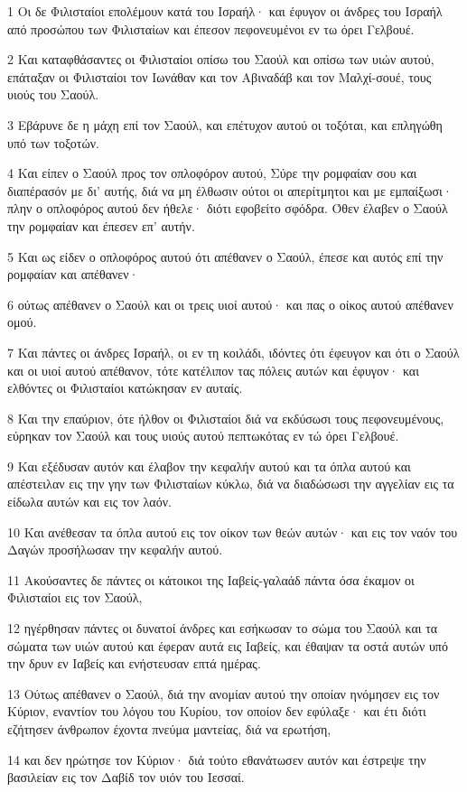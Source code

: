 \par 1 Οι δε Φιλισταίοι επολέμουν κατά του Ισραήλ· και έφυγον οι άνδρες του Ισραήλ από προσώπου των Φιλισταίων και έπεσον πεφονευμένοι εν τω όρει Γελβουέ.
\par 2 Και καταφθάσαντες οι Φιλισταίοι οπίσω του Σαούλ και οπίσω των υιών αυτού, επάταξαν οι Φιλισταίοι τον Ιωνάθαν και τον Αβιναδάβ και τον Μαλχί-σουέ, τους υιούς του Σαούλ.
\par 3 Εβάρυνε δε η μάχη επί τον Σαούλ, και επέτυχον αυτού οι τοξόται, και επληγώθη υπό των τοξοτών.
\par 4 Και είπεν ο Σαούλ προς τον οπλοφόρον αυτού, Σύρε την ρομφαίαν σου και διαπέρασόν με δι' αυτής, διά να μη έλθωσιν ούτοι οι απερίτμητοι και με εμπαίξωσι· πλην ο οπλοφόρος αυτού δεν ήθελε· διότι εφοβείτο σφόδρα. Όθεν έλαβεν ο Σαούλ την ρομφαίαν και έπεσεν επ' αυτήν.
\par 5 Και ως είδεν ο οπλοφόρος αυτού ότι απέθανεν ο Σαούλ, έπεσε και αυτός επί την ρομφαίαν και απέθανεν·
\par 6 ούτως απέθανεν ο Σαούλ και οι τρεις υιοί αυτού· και πας ο οίκος αυτού απέθανεν ομού.
\par 7 Και πάντες οι άνδρες Ισραήλ, οι εν τη κοιλάδι, ιδόντες ότι έφευγον και ότι ο Σαούλ και οι υιοί αυτού απέθανον, τότε κατέλιπον τας πόλεις αυτών και έφυγον· και ελθόντες οι Φιλισταίοι κατώκησαν εν αυταίς.
\par 8 Και την επαύριον, ότε ήλθον οι Φιλισταίοι διά να εκδύσωσι τους πεφονευμένους, εύρηκαν τον Σαούλ και τους υιούς αυτού πεπτωκότας εν τώ όρει Γελβουέ.
\par 9 Και εξέδυσαν αυτόν και έλαβον την κεφαλήν αυτού και τα όπλα αυτού και απέστειλαν εις την γην των Φιλισταίων κύκλω, διά να διαδώσωσι την αγγελίαν εις τα είδωλα αυτών και εις τον λαόν.
\par 10 Και ανέθεσαν τα όπλα αυτού εις τον οίκον των θεών αυτών· και εις τον ναόν του Δαγών προσήλωσαν την κεφαλήν αυτού.
\par 11 Ακούσαντες δε πάντες οι κάτοικοι της Ιαβείς-γαλαάδ πάντα όσα έκαμον οι Φιλισταίοι εις τον Σαούλ,
\par 12 ηγέρθησαν πάντες οι δυνατοί άνδρες και εσήκωσαν το σώμα του Σαούλ και τα σώματα των υιών αυτού και έφεραν αυτά εις Ιαβείς, και έθαψαν τα οστά αυτών υπό την δρυν εν Ιαβείς και ενήστευσαν επτά ημέρας.
\par 13 Ούτως απέθανεν ο Σαούλ, διά την ανομίαν αυτού την οποίαν ηνόμησεν εις τον Κύριον, εναντίον του λόγου του Κυρίου, τον οποίον δεν εφύλαξε· και έτι διότι εζήτησεν άνθρωπον έχοντα πνεύμα μαντείας, διά να ερωτήση,
\par 14 και δεν ηρώτησε τον Κύριον· διά τούτο εθανάτωσεν αυτόν και έστρεψε την βασιλείαν εις τον Δαβίδ τον υιόν του Ιεσσαί.

